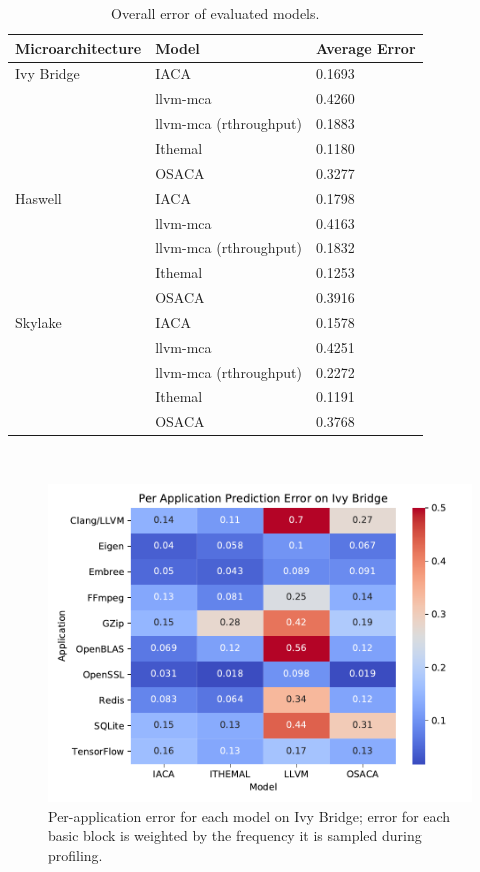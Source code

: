 \begin{table}
\begin{tabular}{|p{}|p{}|p{}|}
\hline

\textbf{Microarchitecture} & \textbf{Model} & \textbf{Average Error}\\
\hline

Ivy Bridge & IACA & 0.1693\\
    & llvm-mca & 0.4260\\
    & llvm-mca (rthroughput) & 0.1883 \\
    & Ithemal & 0.1180\\
    & OSACA & 0.3277\\
\hline

Haswell & IACA & 0.1798\\
    & llvm-mca & 0.4163\\
    & llvm-mca (rthroughput) & 0.1832 \\
    & Ithemal & 0.1253\\
    & OSACA & 0.3916\\
    
\hline 
Skylake & IACA & 0.1578\\
    & llvm-mca & 0.4251\\
    & llvm-mca (rthroughput) & 0.2272 \\
    & Ithemal & 0.1191\\
    & OSACA & 0.3768\\

\hline
\end{tabular}
\\
\caption{Overall error of evaluated models.}
\label{tab:overall}
\end{table}


\begin{figure} \includegraphics[width=\columnwidth]{figures/ivb-app-err.pdf} \caption{Per-application error for each model on Ivy Bridge;
error for each basic block is weighted by the frequency it is sampled during profiling.}
\label{fig:ivb-app-err}
\end{figure}

